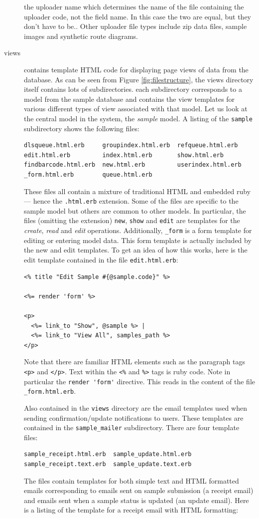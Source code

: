 \documentclass[12pt,twoside]{article}
\begin{document}
\begin{description}
{the uploader name which determines the name of the file containing the
uploader code, not the field name. In this case the two are equal, but
they don't have to be.}.
Other uploader file types include zip data files, sample images and
synthetic route diagrams.
\item[views]
contains template HTML code for displaying page views of data from the
database. As can be seen from Figure \ref{fig:filestructure}, the views
directory itself contains lots of subdirectories. each subdirectory
corresponds to a model from the sample database and contains the view
templates for various different types of view associated with that model.
Let us look at the central model in the system, the \emph{sample} model.
A listing of the \verb=sample= subdirectory shows the following files:
\begin{verbatim}
dlsqueue.html.erb     groupindex.html.erb  refqueue.html.erb
edit.html.erb         index.html.erb       show.html.erb
findbarcode.html.erb  new.html.erb         userindex.html.erb
_form.html.erb        queue.html.erb
\end{verbatim}
These files all contain a mixture of traditional HTML and embedded ruby
--- hence the \verb=.html.erb= extension. Some of the files are specific
to the sample model but others are common to other models. In particular,
the files (omitting the extension) \verb=new=, \verb=show= and \verb=edit=
are templates for the \emph{create}, \emph{read} and
\emph{edit} operations.
Additionally, \verb=_form= is a form template for editing or entering 
model data. This form template is actually included by the new and edit
templates.
To get an idea of how this works, here is the edit template contained
in the file \verb=edit.html.erb=:

\scriptsize
\begin{verbatim}
<% title "Edit Sample #{@sample.code}" %>

<%= render 'form' %>

<p>
  <%= link_to "Show", @sample %> |
  <%= link_to "View All", samples_path %>
</p>
\end{verbatim}
\normalsize

Note that there are familiar HTML elements such as the paragraph tags
\verb=<p>= and \verb=</p>=. Text within the \verb=<%= and \verb=%>=
tags is ruby code. Note in particular the \verb=render 'form'= directive.
This reads in the content of the file \verb=_form.html.erb=.

Also contained in the \verb=views= directory are the email templates used
when sending confirmation/update notifications to users. These 
templates are contained in the \verb=sample_mailer= subdirectory.
There are four template files:
\begin{verbatim}
sample_receipt.html.erb  sample_update.html.erb
sample_receipt.text.erb  sample_update.text.erb
\end{verbatim}
The files contain templates for both simple text and HTML formatted emails
corresponding to emails sent on sample submission (a receipt email)
and emails sent when a sample status is updated (an update email).
Here is a listing of the template for a receipt email with HTML
formatting:


\end{description}
\end{document}
